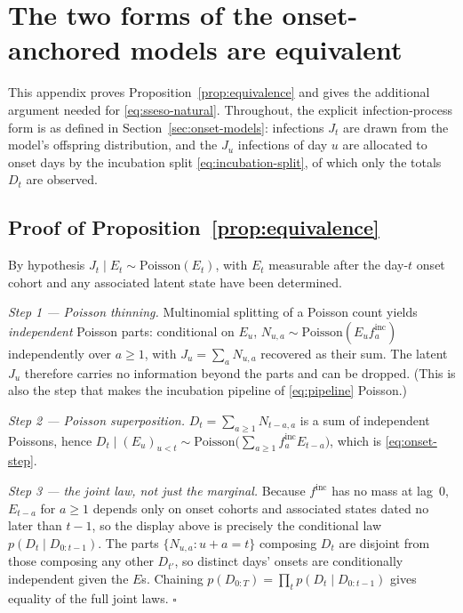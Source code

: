 \documentclass[11pt,a4paper]{article}
\theoremstyle{plain}
\theoremstyle{definition}
\newcommand{\finc}{f^{\mathrm{inc}}}
\newcommand{\Pois}{\mathrm{Poisson}}
\begin{document}
\appendix
\section{The two forms of the onset-anchored models are equivalent}
\label{app:equivalence}

This appendix proves Proposition~\ref{prop:equivalence} and gives the additional argument needed
for \eqref{eq:sseso-natural}. Throughout, the explicit infection-process form is as defined in
Section~\ref{sec:onset-models}: infections $J_t$ are drawn from the model's offspring
distribution, and the $J_u$ infections of day $u$ are allocated to onset days by the incubation
split \eqref{eq:incubation-split}, of which only the totals $D_t$ are observed.

\subsection*{Proof of Proposition~\ref{prop:equivalence}}

By hypothesis $J_t \mid E_t \sim \Pois(E_t)$, with $E_t$ measurable after the day-$t$ onset
cohort and any associated latent state have been determined.

\emph{Step 1 --- Poisson thinning.} Multinomial splitting of a Poisson count yields
\emph{independent} Poisson parts: conditional on $E_u$, $N_{u,a}\sim\Pois(E_u\finc_a)$
independently over $a \ge 1$, with $J_u = \sum_a N_{u,a}$ recovered as their sum. The latent
$J_u$ therefore carries no information beyond the parts and can be dropped. (This is also the
step that makes the incubation pipeline of \eqref{eq:pipeline} Poisson.)

\emph{Step 2 --- Poisson superposition.} $D_t = \sum_{a\ge1}N_{t-a,a}$ is a sum of independent
Poissons, hence $D_t \mid (E_u)_{u<t} \sim \Pois\bigl(\sum_{a\ge1}\finc_a E_{t-a}\bigr)$, which
is \eqref{eq:onset-step}.

\emph{Step 3 --- the joint law, not just the marginal.} Because $\finc$ has no mass at lag~$0$,
$E_{t-a}$ for $a\ge1$ depends only on onset cohorts and associated states dated no later than
$t-1$, so the display above is precisely the
conditional law $p(D_t \mid D_{0:t-1})$. The parts $\{N_{u,a} : u+a=t\}$ composing $D_t$ are
disjoint from those composing any other $D_{t'}$, so distinct days' onsets are conditionally
independent given the $E$s. Chaining $p(D_{0:T}) = \prod_t p(D_t\mid D_{0:t-1})$ gives equality
of the full joint laws. \hfill$\square$
\end{document}
